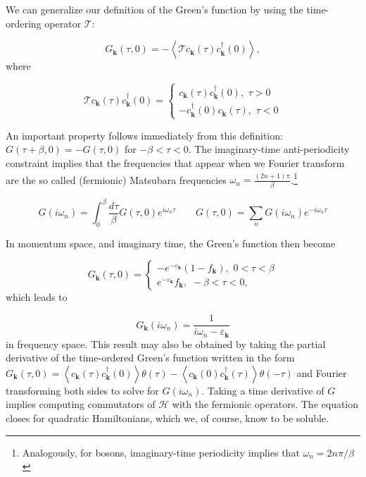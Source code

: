 We can generalize our definition of the Green's function by using the time-ordering operator $\mathcal{T}$:

\begin{equation}
G_{\bm k}(\tau, 0) = - \left\langle \mathcal{T} c_{\bm k} ( \tau) c_{\bm k}^\dagger ( 0 ) \right\rangle ,
\end{equation}
where

\begin{equation}
\mathcal{T} c_{\bm k} ( \tau) c_{\bm k}^\dagger ( 0 ) =
\begin{cases}
c_{\bm k} ( \tau) c_{\bm k}^\dagger ( 0 ), \,\, \tau > 0 \\
- c_{\bm k}^\dagger ( 0 ) c_{\bm k} ( \tau) , \,\, \tau < 0
\end{cases}
\end{equation}

An important property follows immediately from this definition: $G ( \tau + \beta, 0 ) = - G( \tau, 0 )$ for $ -\beta < \tau < 0$.
The imaginary-time anti-periodicity constraint implies that the frequencies that appear when we Fourier transform are the so called (fermionic) Matsubara frequencies $\omega_n = \frac{(2n + 1) \pi}{\beta}$.\footnote{Analogously, for bosons, imaginary-time periodicity implies that $\omega_n = 2n \pi / \beta$}

\begin{equation}
G ( i \omega_n ) = \int_0^\beta \frac{d\tau}{\beta} G( \tau, 0) e^{i\omega_n \tau} \quad\quad G (\tau, 0) = \sum_n G ( i \omega_n ) e^{ - i \omega_n \tau}
\end{equation}

In momentum space, and imaginary time, the Green's function then become

\begin{equation}
G_{\bm k} (\tau, 0 ) =
\begin{cases}
-e^{-\varepsilon_{\bm k}} ( 1 - f_{\bm k} ) , \,\, 0 < \tau < \beta \\
e^{-\varepsilon_{\bm k}} f_{\bm k} , \,\, -\beta < \tau < 0 ,
\end{cases}
\end{equation}
which leads to

\begin{equation}
G_{\bm k} ( i \omega_n ) = \frac{1}{i\omega_n - \varepsilon_{\bm k} }
\end{equation}
in frequency space. This result may also be obtained by taking the partial derivative of the time-ordered Green's function written in the form $
G_{\bm k} ( \tau, 0 ) = \left\langle c_{\bm k} ( \tau) c_{\bm k}^\dagger ( 0 ) \right\rangle \theta ( \tau ) - \left\langle c_{\bm k} ( 0 ) c_{\bm k}^\dagger ( \tau ) \right\rangle \theta ( -\tau )
$
 and Fourier transforming both sides to solve for $G ( i \omega_n )$.
Taking a time derivative of $G$ implies computing commutators of $\mathcal{H}$ with the fermionic operators.
The equation closes for quadratic Hamiltonians, which we, of course, know to be soluble.

